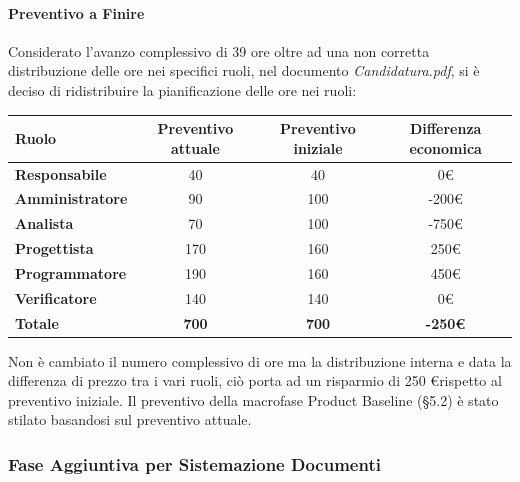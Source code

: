 \paragraph{Preventivo a Finire} \hfill \break
Considerato l'avanzo complessivo di 39 ore oltre ad una non corretta distribuzione delle ore nei specifici ruoli, nel documento \emph{Candidatura.pdf}, si è deciso di ridistribuire la pianificazione delle ore nei ruoli:
\begin{center}
	\renewcommand{\arraystretch}{1.8}
	\begin{tabular}{ | l |c|c|c| }
    \hline
    \textbf{Ruolo} & \textbf{Preventivo attuale} & \textbf{Preventivo iniziale}  & \textbf{Differenza economica}\\
	\hline
    \textbf{Responsabile} & 40 & 40 & 0\euro \\
    \hline
    \textbf{Amministratore} & 90 & 100 & -200\euro \\
    \hline
    \textbf{Analista} & 70 & 100 & -750\euro \\
    \hline
    \textbf{Progettista} & 170 & 160 & 250\euro \\
    \hline
    \textbf{Programmatore} & 190 & 160 & 450\euro \\
    \hline
    \textbf{Verificatore} & 140 & 140 & 0\euro \\
    \hline
    \textbf{Totale} & \textbf{700} & \textbf{700} & \textbf{-250\euro} \\
    \hline
    \end{tabular}
\end{center}
Non è cambiato il numero complessivo di ore ma la distribuzione interna e data la differenza di prezzo tra i vari ruoli, ciò porta ad un risparmio di 250 \euro rispetto al preventivo iniziale. \newline
Il preventivo della macrofase Product Baseline (§5.2) è stato stilato basandosi sul preventivo attuale.

\subsubsection{Fase Aggiuntiva per Sistemazione Documenti}
